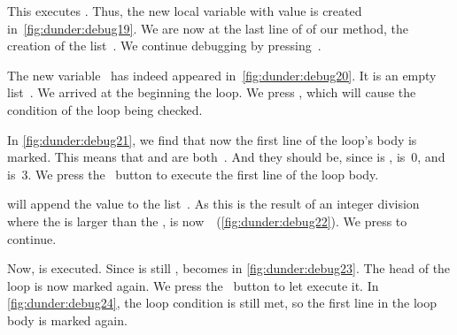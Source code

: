 This executes .
Thus, the new local variable  with value  is created in~\cref{fig:dunder:debug19}.
We are now at the last line of  of our  method, the creation of the list~.
We continue debugging by pressing~.

The new variable~ has indeed appeared in~\cref{fig:dunder:debug20}.
It is an empty list~\pythonil{[]}.
We arrived at the beginning the  loop.
We press , which will cause the condition of the loop being checked.

In \cref{fig:dunder:debug21}, we find that now the first line of the loop's body is marked.
This means that  and  are both~.
And they should be, since  is ,  is~0, and  is~3.
We press the \pycharmDebuggerStepOver~button to execute the first line of the loop body.

 will append the value  to the list~.
As this is the result of an integer division where the  is larger than the ,  is now~\pythonil{[0]}~(\cref{fig:dunder:debug22}).
We press  to continue.

Now,  is executed.
Since  is still ,  becomes  in \cref{fig:dunder:debug23}.
The head of the loop is now marked again.
We press the \pycharmDebuggerStepOver~button to let execute it.
In \cref{fig:dunder:debug24}, the loop condition is still met, so the first line in the loop body is marked again.

